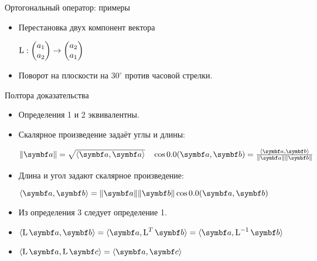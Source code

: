 \begin{frame}{Ортогональный оператор: примеры}


\begin{itemize}[<+->]
    \item Перестановка двух компонент вектора
    
    $\operatorname{L}: \begin{pmatrix}
        a_1 \\
        a_2
    \end{pmatrix} \to
    \begin{pmatrix}
        a_2 \\
        a_1
    \end{pmatrix}$

    \item Поворот на плоскости на $30^{\circ}$ против часовой стрелки.

\end{itemize}

\end{frame}
    


\begin{frame}{Полтора доказательства}


\begin{itemize}[<+->]
    \item Определения 1 и 2 эквивалентны.
    
    \item Скалярное произведение задаёт углы и длины:

    $\norm{\ba} = \sqrt{\langle \ba, \ba\rangle} \quad \cos\angle (\ba, \bb)= \frac{\langle \ba, \bb\rangle} {\norm{\ba} \norm{\bb}}$

    \item Длина и угол задают скалярное произведение:

    $\langle \ba, \bb \rangle = \norm{\ba} \norm{\bb} \cos \angle (\ba, \bb)$
    \item Из определения 3 следует определение 1.
    
    \item $\langle \LL \ba, \bb \rangle = \langle \ba, \LL^T \bb \rangle= \langle \ba, \LL^{-1}\bb \rangle$

    \item $\langle \LL \ba, \LL \bc \rangle = \langle \ba, \bc \rangle$

\end{itemize}
    
\end{frame}

